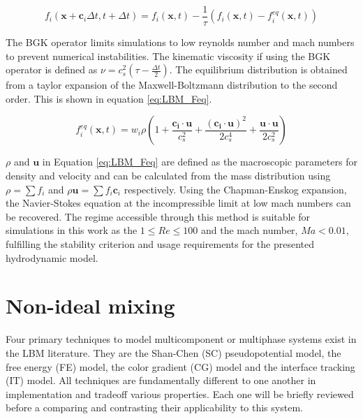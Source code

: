 \begin{equation}
    f_{i}(\mathbf{x} + \mathbf{c}_{i}\Delta t, t + \Delta t) = f_{i}(\mathbf{x}, t) - \frac{1}{\tau}(f_{i}(\mathbf{x}, t) 
    - f_{i}^{eq}(\mathbf{x}, t))
    \label{eq:LBM_BGK}
\end{equation}

The BGK operator limits simulations to low reynolds number and mach numbers to prevent numerical instabilities. 
\cite{qian_lattice_1992} The kinematic viscosity if using the BGK operator is defined as 
$\nu = c_s^2(\tau - \frac{\Delta t}{2})$. The equilibrium distribution is obtained from a taylor expansion of the 
Maxwell-Boltzmann distribution to the second order. \cite{he_theory_1997, succi_lattice_2018} This is shown in equation 
\ref{eq:LBM_Feq}.

\begin{equation}
    f_{i}^{eq}(\mathbf{x}, t) = w_i\rho(1 + \frac{\mathbf{c_i} \cdot \mathbf{u}}{c_s^2} + \frac{(\mathbf{c_i} \cdot 
    \mathbf{u})^2}{2c_s^4} + \frac{\mathbf{u} \cdot \mathbf{u}}{2c_s^2})
    \label{eq:LBM_Feq}
\end{equation}

$\rho$ and $\textbf{u}$ in Equation \ref{eq:LBM_Feq} are defined as the macroscopic parameters for density and velocity 
and can be calculated from the mass distribution using $\rho = \sum f_i$ and $\rho \mathbf{u} = \sum f_i \mathbf{c}_i$ 
respectively. Using the Chapman-Enskog expansion, the Navier-Stokes equation at the incompressible limit at low mach
numbers can be recovered. \cite{qian_lattice_1992, he_lattice_1997} The regime accessible through this method is suitable 
for simulations in this work as the $ 1 \leq Re \leq 100 $ and the mach number, $Ma < 0.01$, fulfilling the stability 
criterion and usage requirements for the presented hydrodynamic model.

\section{Non-ideal mixing}
\label{section:lbm_non_ideal_mixing}

Four primary techniques to model multicomponent or multiphase systems exist in the LBM literature. They are the Shan-Chen (SC) pseudopotential
model, the free energy (FE) model, the color gradient (CG) model and the interface tracking (IT) model. All techniques are fundamentally different to one
another in implementation and tradeoff various properties. Each one will be briefly reviewed before a comparing and contrasting their applicability
to this system. 

